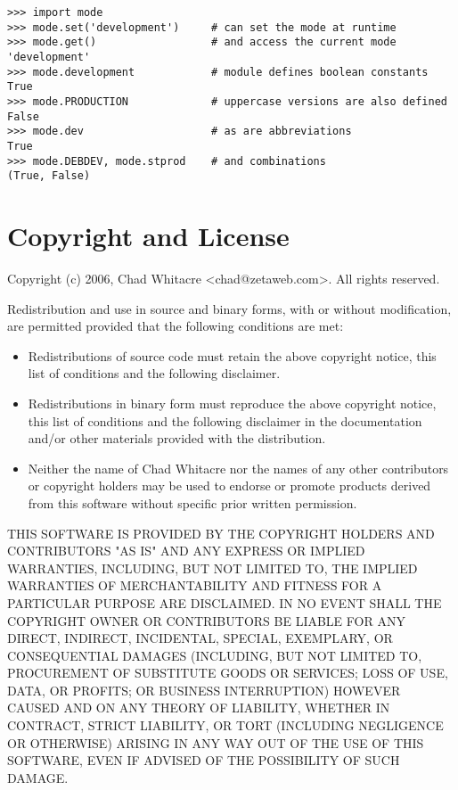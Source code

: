 \documentclass{manual}
\begin{document}
\begin{verbatim}
>>> import mode
>>> mode.set('development')     # can set the mode at runtime
>>> mode.get()                  # and access the current mode
'development'
>>> mode.development            # module defines boolean constants
True
>>> mode.PRODUCTION             # uppercase versions are also defined
False
>>> mode.dev                    # as are abbreviations
True
>>> mode.DEBDEV, mode.stprod    # and combinations
(True, False)
\end{verbatim}

\chapter{Copyright and License}

Copyright (c) 2006, Chad Whitacre <chad@zetaweb.com>. All rights reserved.

Redistribution and use in source and binary forms, with or without modification,
are permitted provided that the following conditions are met:

\begin{itemize}

\item{Redistributions of source code must retain the above copyright notice,
this list of conditions and the following disclaimer.}

\item{Redistributions in binary form must reproduce the above copyright notice,
this list of conditions and the following disclaimer in the documentation and/or
other materials provided with the distribution.}

\item{Neither the name of Chad Whitacre nor the names of any other contributors
or copyright holders may be used to endorse or promote products derived from
this software without specific prior written permission.}

\end{itemize}

THIS SOFTWARE IS PROVIDED BY THE COPYRIGHT HOLDERS AND CONTRIBUTORS "AS IS" AND
ANY EXPRESS OR IMPLIED WARRANTIES, INCLUDING, BUT NOT LIMITED TO, THE IMPLIED
WARRANTIES OF MERCHANTABILITY AND FITNESS FOR A PARTICULAR PURPOSE ARE
DISCLAIMED. IN NO EVENT SHALL THE COPYRIGHT OWNER OR CONTRIBUTORS BE LIABLE FOR
ANY DIRECT, INDIRECT, INCIDENTAL, SPECIAL, EXEMPLARY, OR CONSEQUENTIAL DAMAGES
(INCLUDING, BUT NOT LIMITED TO, PROCUREMENT OF SUBSTITUTE GOODS OR SERVICES;
LOSS OF USE, DATA, OR PROFITS; OR BUSINESS INTERRUPTION) HOWEVER CAUSED AND ON
ANY THEORY OF LIABILITY, WHETHER IN CONTRACT, STRICT LIABILITY, OR TORT
(INCLUDING NEGLIGENCE OR OTHERWISE) ARISING IN ANY WAY OUT OF THE USE OF THIS
SOFTWARE, EVEN IF ADVISED OF THE POSSIBILITY OF SUCH DAMAGE.
\end{document}
